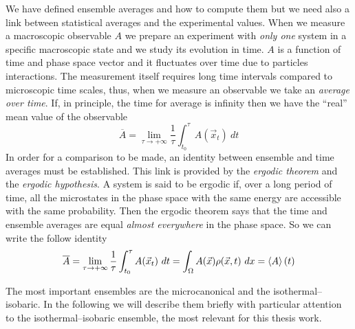 We have defined ensemble averages and how to compute them but we need also a link between statistical averages and the experimental values. When we measure a macroscopic observable $A$ we prepare an experiment with \textit{only one} system in a specific macroscopic state and we study its evolution in time. $A$ is a function of time and phase space vector and it fluctuates over time due to particles interactions. The measurement itself requires long time intervals compared to microscopic time scales, thus, when we measure an observable we take an \textit{average over time}.
If, in principle, the time for average is infinity then we have the ``real'' mean value of the observable
\begin{equation*}
	\overline{A} = \lim_{\tau\to +\infty}\frac{1}{\tau}\int_{t_0}^\tau A(\vec x_t)\ dt
	\label{eq:timeAve}
\end{equation*}
In order for a comparison to be made, an identity between ensemble and time averages must be established.
This link is provided by the \textit{ergodic theorem} and the \textit{ergodic hypothesis}. A system is said to be ergodic if, over a long period of time, all the microstates in the phase space with the same energy are accessible with the same probability. Then the ergodic theorem says that the time and ensemble averages are equal \textit{almost everywhere} in the phase space. So we can write the follow identity
\begin{equation}
	\overline{A} = \lim_{\tau\to +\infty}\frac{1}{\tau}\int_{t_0}^\tau A(\vec x_t)\ dt = \int_\Omega A(\vec x)\rho(\vec x, t)\ dx = \left \langle A \right \rangle(t)
	\label{eq:ergotic}
\end{equation}

The most important ensembles are the microcanonical and the isothermal--isobaric. In the following we will describe them briefly with particular attention to the isothermal--isobaric ensemble, the most relevant for this thesis work.

